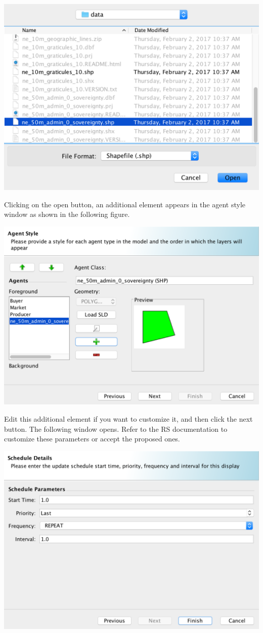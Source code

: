 \documentclass{article}
\begin{document}
\includegraphics[scale=0.35]{fig_cms_rs_gis6}

Clicking on the open button, an additional element appears in the agent style window as shown in the following figure.

\includegraphics[scale=0.35]{fig_cms_rs_gis7}

Edit this additional element if you want to customize it, and then click the next button. The following window opens. Refer to the RS documentation to customize these parameters or accept the proposed ones.

\includegraphics[scale=0.35]{fig_cms_rs_gis8}
\end{document}
